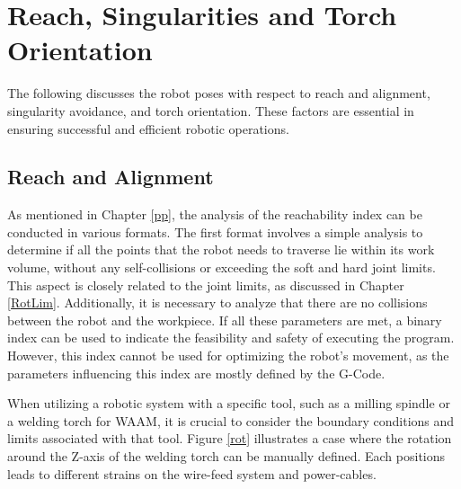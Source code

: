 \section{Reach, Singularities and Torch Orientation}
The following discusses the robot poses with respect to reach and alignment, singularity avoidance, and torch orientation. These factors are essential in ensuring successful and efficient robotic operations.

\subsection{Reach and Alignment}\label{RO}

As mentioned in Chapter \ref{pp}, the analysis of the reachability index can be conducted in various formats. The first format involves a simple analysis to determine if all the points that the robot needs to traverse lie within its work volume, without any self-collisions or exceeding the soft and hard joint limits. This aspect is closely related to the joint limits, as discussed in Chapter \ref{RotLim}. Additionally, it is necessary to analyze that there are no collisions between the robot and the workpiece. If all these parameters are met, a binary index can be used to indicate the feasibility and safety of executing the program. However, this index cannot be used for optimizing the robot's movement, as the parameters influencing this index are mostly defined by the G-Code.

When utilizing a robotic system with a specific tool, such as a milling spindle or a welding torch for \acrshort{WAAM}, it is crucial to consider the boundary conditions and limits associated with that tool. Figure \ref{rot} illustrates a case where the rotation around the Z-axis of the welding torch can be manually defined. Each positions leads to different strains on the wire-feed system and power-cables.

